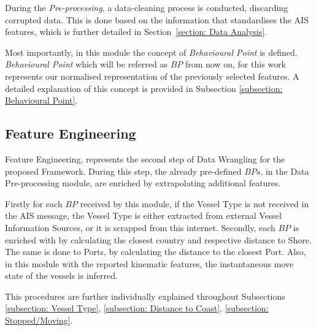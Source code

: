 During the \emph{Pre-processing}, a data-cleaning process is conducted, discarding corrupted data. This is done based on the information that standardises the AIS features, which is further detailed in Section~\ref{section: Data Analysis}.

Most importantly, in this module the concept of \emph{Behavioural Point} is defined. \emph{Behavioural Point} which will be referred as $BP$ from now on, for this work represents our normalised representation of the previously selected features. A detailed explanation of this concept is provided in Subsection \ref{subsection: Behavioural Point}.

\subsection{Feature Engineering}
\label{subsection: 3 Feature Engineering}
Feature Engineering, represents the second step of Data Wrangling for the proposed Framework. During this step, the already pre-defined $BPs$, in the Data Pre-processing module, are enriched by extrapolating additional features. 

Firstly for each $BP$ received by this module, if the Vessel Type is not received in the AIS message, the Vessel Type is either extracted from external Vessel Information Sources, or it is scrapped from this internet.
Secondly, each $BP$ is enriched with by calculating the closest country and respective distance to Shore. The same is done to Ports, by calculating the distance to the closest Port. Also, in this module with the reported kinematic features, the instantaneous move state of the vessels is inferred.

This procedures are further individually explained throughout Subsections \ref{subsection: Vessel Type}, \ref{subsection: Distance to Coast}, \ref{subsection: Stopped/Moving}.





